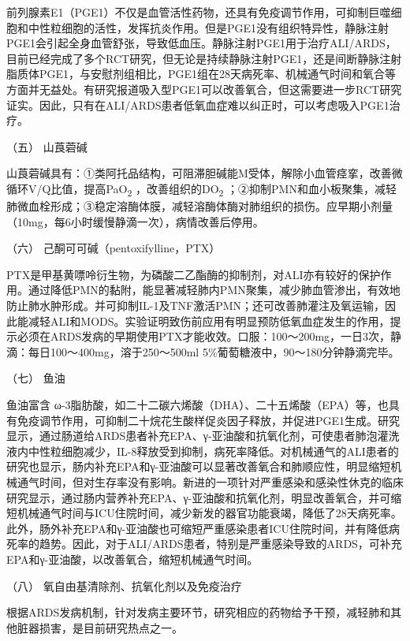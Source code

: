 前列腺素E1（PGE1）不仅是血管活性药物，还具有免疫调节作用，可抑制巨噬细胞和中性粒细胞的活性，发挥抗炎作用。但是PGE1没有组织特异性，静脉注射PGE1会引起全身血管舒张，导致低血压。静脉注射PGE1用于治疗ALI/ARDS，目前已经完成了多个RCT研究，但无论是持续静脉注射PGE1，还是间断静脉注射脂质体PGE1，与安慰剂组相比，PGE1组在28天病死率、机械通气时间和氧合等方面并无益处。有研究报道吸入型PGE1可以改善氧合，但这需要进一步RCT研究证实。因此，只有在ALI/ARDS患者低氧血症难以纠正时，可以考虑吸入PGE1治疗。

\hypertarget{text00078.htmlux5cux23CHP3-5-3-6-5}{}
（五） 山莨菪碱

山莨菪碱具有：①类阿托品结构，可阻滞胆碱能M受体，解除小血管痉挛，改善微循环V/Q比值，提高PaO\textsubscript{2}
，改善组织的DO\textsubscript{2}
；②抑制PMN和血小板聚集，减轻肺微血栓形成；③稳定溶酶体膜，减轻溶酶体酶对肺组织的损伤。应早期小剂量（10mg，每6小时缓慢静滴一次），病情改善后停用。

\hypertarget{text00078.htmlux5cux23CHP3-5-3-6-6}{}
（六） 己酮可可碱（pentoxifylline，PTX）

PTX是甲基黄嘌呤衍生物，为磷酸二乙酯酶的抑制剂，对ALI亦有较好的保护作用。通过降低PMN的黏附，能显著减轻肺内PMN聚集，减少肺血管渗出，有效地防止肺水肿形成。并可抑制IL-1及TNF激活PMN；还可改善肺灌注及氧运输，因此能减轻ALI和MODS。实验证明致伤前应用有明显预防低氧血症发生的作用，提示必须在ARDS发病的早期使用PTX才能收效。口服：100～200mg，一日3次，静滴：每日100～400mg，溶于250～500ml
5\%葡萄糖液中，90～180分钟静滴完毕。

\hypertarget{text00078.htmlux5cux23CHP3-5-3-6-7}{}
（七） 鱼油

鱼油富含
ω-3脂肪酸，如二十二碳六烯酸（DHA）、二十五烯酸（EPA）等，也具有免疫调节作用，可抑制二十烷花生酸样促炎因子释放，并促进PGE1生成。研究显示，通过肠道给ARDS患者补充EPA、γ-亚油酸和抗氧化剂，可使患者肺泡灌洗液内中性粒细胞减少，IL-8释放受到抑制，病死率降低。对机械通气的ALI患者的研究也显示，肠内补充EPA和γ-亚油酸可以显著改善氧合和肺顺应性，明显缩短机械通气时间，但对生存率没有影响。新进的一项针对严重感染和感染性休克的临床研究显示，通过肠内营养补充EPA、γ-亚油酸和抗氧化剂，明显改善氧合，并可缩短机械通气时间与ICU住院时间，减少新发的器官功能衰竭，降低了28天病死率。此外，肠外补充EPA和γ-亚油酸也可缩短严重感染患者ICU住院时间，并有降低病死率的趋势。因此，对于ALI/ARDS患者，特别是严重感染导致的ARDS，可补充EPA和γ-亚油酸，以改善氧合，缩短机械通气时间。

\hypertarget{text00078.htmlux5cux23CHP3-5-3-6-8}{}
（八） 氧自由基清除剂、抗氧化剂以及免疫治疗

根据ARDS发病机制，针对发病主要环节，研究相应的药物给予干预，减轻肺和其他脏器损害，是目前研究热点之一。

